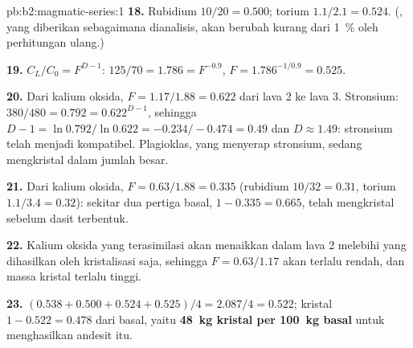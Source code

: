 \begin{solution}{pb:b2:magmatic-series:1}
\textbf{18.} Rubidium $10/20 = 0.500$; torium $1.1/2.1 = 0.524$. (, yang diberikan sebagaimana dianalisis, akan berubah kurang dari \qty{1}{\percent} oleh
perhitungan ulang.)

\textbf{19.} $C_L/C_0 = F^{D - 1}$: $125/70 = 1.786 = F^{-0.9}$, $F = 1.786^{-1/0.9} =
0.525$.

\textbf{20.} Dari kalium oksida, $F = 1.17/1.88 = 0.622$ dari lava 2 ke lava 3. Stronsium:
$380/480 = 0.792 = 0.622^{D - 1}$, sehingga $D - 1 = \ln 0.792/\ln 0.622 = -0.234/-0.474 =
0.49$ dan $D \approx 1.49$: stronsium telah menjadi kompatibel. Plagioklas, yang menyerap
stronsium, sedang mengkristal dalam jumlah besar.

\textbf{21.} Dari kalium oksida, $F = 0.63/1.88 = 0.335$ (rubidium $10/32 = 0.31$, torium
$1.1/3.4 = 0.32$): sekitar dua pertiga basal, $1 - 0.335 = 0.665$, telah mengkristal
sebelum dasit terbentuk.

\textbf{22.} Kalium oksida yang terasimilasi akan menaikkan  dalam lava 2 melebihi yang
dihasilkan oleh kristalisasi saja, sehingga $F = 0.63/1.17$ akan terlalu rendah, dan massa
kristal terlalu tinggi.

\textbf{23.} $(0.538 + 0.500 + 0.524 + 0.525)/4 = 2.087/4 = 0.522$; kristal $1 - 0.522
= 0.478$ dari basal, yaitu \textbf{\qty[text-series-to-math=true]{48}{kg}
kristal per \qty{100}{kg} basal} untuk menghasilkan andesit itu.
\end{solution}
